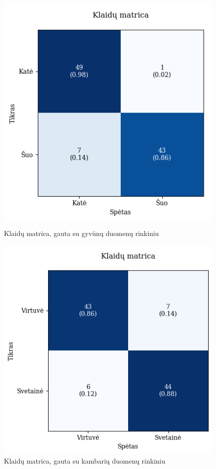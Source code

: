 \documentclass{VUMIFPSbakalaurinis}
\begin{document}
\begin{figure}[!htbp]
    \centering
    \begin{minipage}[b]{0.48\textwidth}
      \includegraphics[width=\textwidth]{img/GrapthsNEW/Large/animal/5/KM_DC_L_5.png}
      \caption{Klaidų matrica, gauta su gyvūnų duomenų rinkiniu}
    \end{minipage}
    \hspace{2mm}
    \begin{minipage}[b]{0.48\textwidth}
      \includegraphics[width=\textwidth]{img/GrapthsNEW/Large/room/5/KM_R_L_5.png}
      \caption{Klaidų matrica, gauta su kambarių duomenų rinkiniu}
    \end{minipage}
\end{figure}
\end{document}
